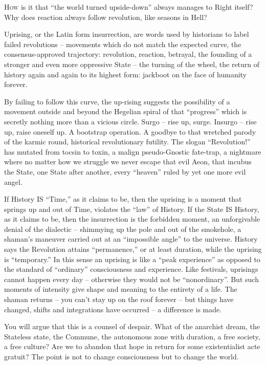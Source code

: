 \documentclass[a4paper,english,10pt,twoside]{article}
\begin{document}
\lettrine{H}{ow} is it that \enquote{the world turned upside-down} always manages to Right itself? Why does reaction always follow revolution, like seasons in Hell?

\medskip
Uprising, or the Latin form insurrection, are words used by historians to label failed revolutions -- movements which do not match the expected curve, the consensus-approved trajectory: revolution, reaction, betrayal, the founding of a stronger and even more oppressive State -- the turning of the wheel, the return of history again and again to its highest form: jackboot on the face of humanity forever.

\medskip
By failing to follow this curve, the up-rising suggests the possibility of a movement outside and beyond the Hegelian spiral of that \enquote{progress} which is secretly nothing more than a vicious circle. Surgo -- rise up, surge. Insurgo -- rise up, raise oneself up. A bootstrap operation. A goodbye to that wretched parody of the karmic round, historical revolutionary futility. The slogan \enquote{Revolution!} has mutated from tocsin to toxin, a malign pseudo-Gnostic fate-trap, a nightmare where no matter how we struggle we never escape that evil Aeon, that incubus the State, one State after another, every \enquote{heaven} ruled by yet one more evil angel.

\medskip
If History IS \enquote{Time,} as it claims to be, then the uprising is a moment that springs up and out of Time, violates the \enquote{law} of History. If the State IS History, as it claims to be, then the insurrection is the forbidden moment, an unforgivable denial of the dialectic -- shimmying up the pole and out of the smokehole, a shaman's maneuver carried out at an \enquote{impossible angle} to the universe. History says the Revolution attains \enquote{permanence,} or at least duration, while the uprising is \enquote{temporary.} In this sense an uprising is like a \enquote{peak experience} as opposed to the standard of \enquote{ordinary} consciousness and experience. Like festivals, uprisings cannot happen every day -- otherwise they would not be \enquote{nonordinary}. But such moments of intensity give shape and meaning to the entirety of a life. The shaman returns -- you can't stay up on the roof forever -- but things have changed, shifts and integrations have occurred -- a difference is made.

\medskip
You will argue that this is a counsel of despair. What of the anarchist dream, the Stateless state, the Commune, the autonomous zone with duration, a free society, a free culture? Are we to abandon that hope in return for some existentialist acte gratuit? The point is not to change consciousness but to change the world.
\end{document}
